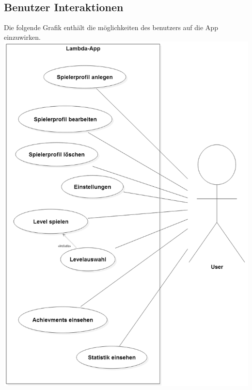 \documentclass{scrartcl}
\begin{document}
\begin{minipage}{1\textwidth}
\subsection{Benutzer Interaktionen}
Die folgende Grafik enthält die möglichkeiten des benutzers auf die App einzuwirken.\\
\includegraphics[width=\textwidth]{assets/Benutzerdiagramm}
\end{minipage}

\clearpage






{}
\printglossary[title=Glossar]
\thispagestyle{empty}
    
\end{document}
